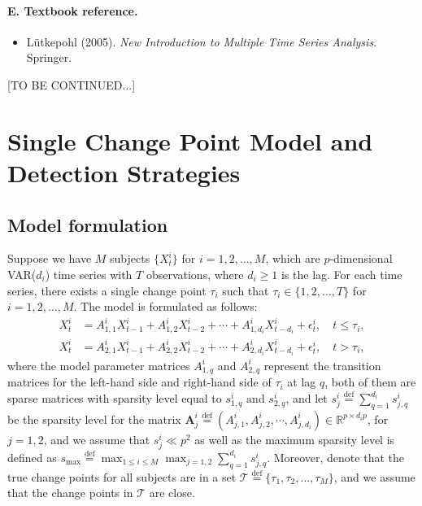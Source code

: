 \documentclass[11pt]{article}
\begin{document}
\paragraph{E. Textbook reference.}
\begin{itemize}
    \item L\"utkepohl (2005). \emph{New Introduction to Multiple Time Series Analysis.} Springer. \cite{lutkepohl2005new}
\end{itemize}

[TO BE CONTINUED...]


\section{Single Change Point Model and Detection Strategies}\label{sec:single-cp}
\subsection{Model formulation}
Suppose we have $M$ subjects $\{X_t^i\}$ for $i=1,2,\dots, M$, which are $p$-dimensional VAR($d_i$) time series with $T$ observations, where $d_i \geq 1$ is the lag. For each time series, there exists a single change point $\tau_i$ such that $\tau_i \in \{1,2,\dots, T\}$ for $i=1,2,\dots, M$. The model is formulated as follows:
\begin{equation}
    \label{eq:1}
    \begin{aligned}
        X_t^i &= A_{1,1}^iX_{t-1}^i + A_{1,2}^iX_{t-2}^i + \cdots + A_{1,d_i}^iX_{t-d_i}^i + \epsilon_t^i, \quad t \leq \tau_i, \\
        X_t^i &= A_{2,1}^iX_{t-1}^i + A_{2,2}^iX_{t-2}^i + \cdots + A_{2,d_i}^iX_{t-d_i}^i + \epsilon_t^i, \quad t > \tau_i,
    \end{aligned}
\end{equation}
where the model parameter matrices $A_{1,q}^i$ and $A_{2,q}^i$ represent the transition matrices for the left-hand side and right-hand side of $\tau_i$ at lag $q$, both of them are sparse matrices with sparsity level equal to $s_{1,q}^i$ and $s_{2,q}^i$, and let $s_j^i \overset{\text{def}}{=} \sum_{q=1}^{d_i}s_{j,q}^i$ be the sparsity level for the matrix $\mathbf{A}_j^i \overset{\text{def}}{=} (A_{j,1}^i, A_{j,2}^i, \cdots, A_{j,d_{i}}^i) \in \mathbb{R}^{p \times d_ip}$, for $j=1,2$, and we assume that $s_j^i \ll p^2$ as well as the maximum sparsity level is defined as $s_{\max} \overset{\text{def}}{=} \max_{1\leq i \leq M}\max_{j=1,2}\sum_{q=1}^{d_i} s_{j,q}^i$. Moreover, denote that the true change points for all subjects are in a set $\mathcal{T} \overset{\text{def}}{=} \{\tau_1, \tau_2, \dots, \tau_M\}$, and we assume that the change points in $\mathcal{T}$ are close.
\end{document}
